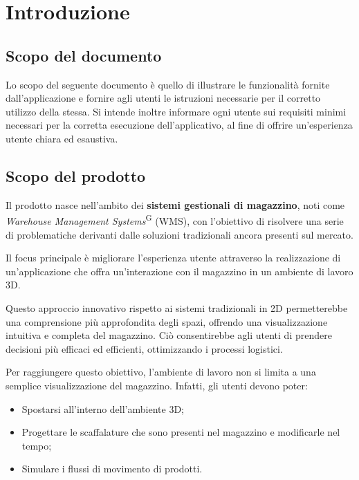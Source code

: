 \section{Introduzione}
\subsection{Scopo del documento}\label{sec:scopo_del_documento}
    Lo scopo del seguente documento è quello di illustrare le funzionalità fornite dall'applicazione e fornire agli utenti le istruzioni necessarie per il corretto utilizzo 
    della stessa. Si intende inoltre informare ogni utente sui requisiti minimi necessari per la corretta esecuzione dell'applicativo, al fine di offrire un'esperienza utente chiara ed esaustiva.

\subsection{Scopo del prodotto}\label{sec:scopo_del_progetto}
    Il prodotto nasce nell'ambito dei \textbf{sistemi gestionali di magazzino}, noti come \textit{Warehouse Management Systems}\textsuperscript{G} (WMS), con l'obiettivo di risolvere una serie di problematiche derivanti dalle soluzioni tradizionali ancora presenti sul mercato. 
    
    Il focus principale è migliorare l'esperienza utente attraverso la realizzazione di un'applicazione che offra un'interazione con il magazzino in un ambiente di lavoro 3D. 
    
    Questo approccio innovativo rispetto ai sistemi tradizionali in 2D permetterebbe una comprensione più approfondita degli spazi, offrendo una visualizzazione intuitiva e completa del magazzino. Ciò consentirebbe agli utenti di prendere decisioni più efficaci ed efficienti, ottimizzando i processi logistici.

    Per raggiungere questo obiettivo, l'ambiente di lavoro non si limita a una semplice visualizzazione del magazzino. Infatti, gli utenti devono poter:
    \begin{itemize}
        \item Spostarsi all'interno dell'ambiente 3D;
        \item Progettare le scaffalature che sono presenti nel magazzino e modificarle nel tempo;
        \item Simulare i flussi di movimento di prodotti.
    \end{itemize}

